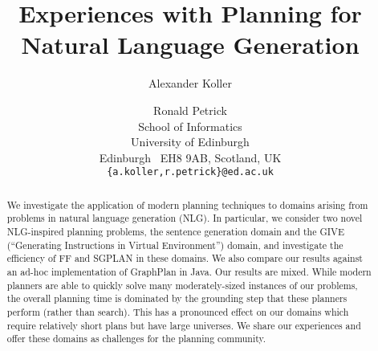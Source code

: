 \documentclass[letterpaper]{article}
\title{Experiences with Planning for Natural Language Generation}
\author{Alexander Koller \and Ronald Petrick \\
School of Informatics \\
University of Edinburgh \\
Edinburgh \ EH8 9AB, Scotland, UK \\
\texttt{\{a.koller,r.petrick\}@ed.ac.uk}}
\begin{document}
\maketitle


\begin{abstract}
We investigate the application of modern planning techniques to domains
arising from problems in natural language generation (NLG). In particular,
we consider two novel NLG-inspired planning problems, the sentence
generation domain and the GIVE (``Generating Instructions in Virtual
Environment'') domain, and investigate the efficiency of FF and SGPLAN in
these domains. We also compare our results against an ad-hoc implementation
of GraphPlan in Java. Our results are mixed. While modern planners are able
to quickly solve many moderately-sized instances of our problems, the
overall planning time is dominated by the grounding step that these
planners perform (rather than search). This has a pronounced effect on our
domains which require relatively short plans but have large universes. We
share our experiences and offer these domains as challenges for the
planning community.
\end{abstract}











\end{document}
